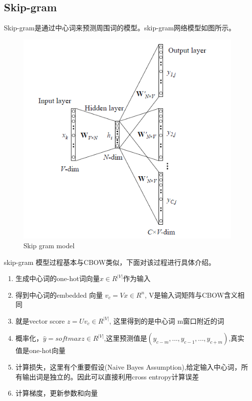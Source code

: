 \documentclass[twoside,nofonts,fancyhdr,openany,UTF8]{ctexbook}
\begin{document}
\subsection{Skip-gram}
Skip-gram是通过中心词来预测周围词的模型。skip-gram网络模型如图所示。
\begin{figure}[!htb]
\centering
\includegraphics[scale=0.3]{skip-gram}
\caption{Skip gram model}
\end{figure}
skip-gram 模型过程基本与CBOW类似，下面对该过程进行具体介绍。
\begin{enumerate}
\item 生成中心词的one-hot词向量$x \in R^{|V|}$作为输入
\item 得到中心词的embedded 向量 $v_{c}=Vx \in R^{n}$, V是输入词矩阵与CBOW含义相同
\item 就是vector score $z=Uv_{c} \in R^{|V|}$, 这里得到的是中心词 m窗口附近的词
\item 概率化，$\widehat{y}=softmax{z} \in R^{|V|}$,这里预测值是$(y_{c-m},...,y_{c-1},...,y_{c+m})$,真实值是one-hot向量
\item 计算损失，这里有个重要假设(Naive Bayes Assumption),给定输入中心词，所有输出词是独立的。因此可以直接利用cross entropy计算误差
\item 计算梯度，更新参数和向量
\end{enumerate}
\end{document}
